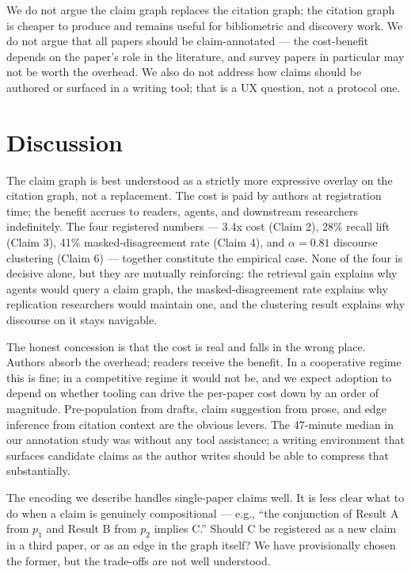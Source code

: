 \documentclass{rrxiv}
\begin{document}
\begin{scope}
We do not argue the claim graph replaces the citation graph; the citation graph is cheaper to produce and remains useful for bibliometric and discovery work. We do not argue that all papers should be claim-annotated --- the cost-benefit depends on the paper's role in the literature, and survey papers in particular may not be worth the overhead. We also do not address how claims should be authored or surfaced in a writing tool; that is a UX question, not a protocol one.
\end{scope}

\section{Discussion}

The claim graph is best understood as a strictly more expressive overlay on the citation graph, not a replacement. The cost is paid by authors at registration time; the benefit accrues to readers, agents, and downstream researchers indefinitely. The four registered numbers --- 3.4x cost (Claim 2), 28\% recall lift (Claim 3), 41\% masked-disagreement rate (Claim 4), and $\alpha = 0.81$ discourse clustering (Claim 6) --- together constitute the empirical case. None of the four is decisive alone, but they are mutually reinforcing: the retrieval gain explains why agents would query a claim graph, the masked-disagreement rate explains why replication researchers would maintain one, and the clustering result explains why discourse on it stays navigable.

The honest concession is that the cost is real and falls in the wrong place. Authors absorb the overhead; readers receive the benefit. In a cooperative regime this is fine; in a competitive regime it would not be, and we expect adoption to depend on whether tooling can drive the per-paper cost down by an order of magnitude. Pre-population from drafts, claim suggestion from prose, and edge inference from citation context are the obvious levers. The 47-minute median in our annotation study was without any tool assistance; a writing environment that surfaces candidate claims as the author writes should be able to compress that substantially.

\begin{openquestion}
The encoding we describe handles single-paper claims well. It is less clear what to do when a claim is genuinely compositional --- e.g., ``the conjunction of Result A from $p_1$ and Result B from $p_2$ implies C.'' Should C be registered as a new claim in a third paper, or as an edge in the graph itself? We have provisionally chosen the former, but the trade-offs are not well understood.
\end{openquestion}
\end{document}
